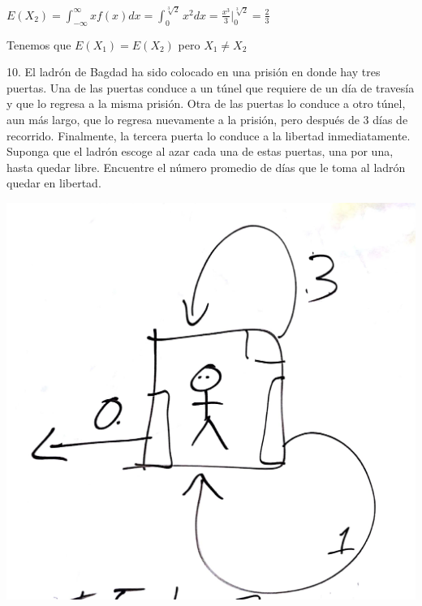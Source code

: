 \documentclass{article}
\begin{document}
        $E(X_2)=\displaystyle{\int_{-\infty}^{\infty}}xf(x) dx=\displaystyle{\int_{0}^{\displaystyle\sqrt[3]{2}}}x^2 dx=\frac{x^3}{3}|_0^{\sqrt[3]{2}}=\frac{2}{3}$\vspace{.1cm}

        Tenemos que $E(X_1)=E(X_2)$ pero $X_1\neq X_2$\vspace{.3cm}


        10. El ladrón de Bagdad ha sido colocado en una prisión 
        en donde hay tres puertas. Una de las puertas conduce a un 
        túnel que requiere de un día de travesía y que lo regresa a 
        la misma prisión. Otra de las puertas lo conduce a otro túnel, 
        aun más largo, que lo regresa nuevamente a la prisión, pero 
        después de 3 días de recorrido. Finalmente, la tercera puerta 
        lo conduce a la libertad inmediatamente. Suponga que el 
        ladrón escoge al azar cada una de estas puertas, una por una, 
        hasta quedar libre. Encuentre el número promedio de días 
        que le toma al ladrón quedar en libertad.\vspace{.1cm}

        \vspace{.1cm}

        \begin{center}
            \includegraphics[scale=0.09]{sujeto.jpg}   
        \end{center}\vspace{.1cm}
\end{document}
